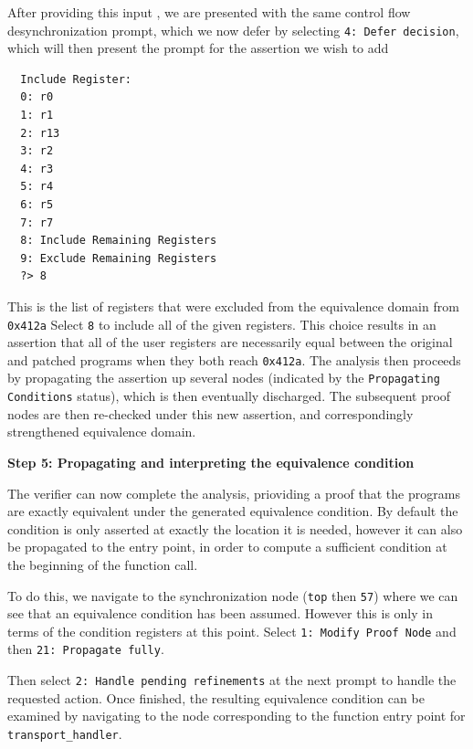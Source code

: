After providing this input , we are presented with the same control flow desynchronization prompt, which we
now defer by selecting \texttt{4: Defer decision}, which will then present the prompt for the assertion we wish to add
\begin{verbatim}
  Include Register:
  0: r0
  1: r1
  2: r13
  3: r2
  4: r3
  5: r4
  6: r5
  7: r7
  8: Include Remaining Registers
  9: Exclude Remaining Registers
  ?> 8
\end{verbatim}

This is the list of registers that were excluded from the equivalence domain from \texttt{0x412a}
Select \texttt{8} to include all of the given registers. This choice results in an assertion that all
of the user registers are necessarily equal between the original and patched programs when they both
reach \texttt{0x412a}.  The analysis then proceeds by propagating the assertion up several nodes
(indicated by the \texttt{Propagating Conditions} status), which is then eventually discharged. The
subsequent proof nodes are then re-checked under this new assertion, and correspondingly strengthened
equivalence domain.

\noindent\textbf{Step 5: Propagating and interpreting the equivalence condition}

The verifier can now complete the analysis, prioviding a proof that the programs are exactly
equivalent under the generated equivalence condition. By default the condition is only asserted at
exactly the location it is needed, however it can also be propagated to the entry point, in order to
compute a sufficient condition at the beginning of the function call.

To do this, we navigate to the synchronization node (\texttt{top} then \texttt{57}) where we can see
that an equivalence condition has been assumed. However this is only in terms of the
condition registers at this point. Select \texttt{1: Modify Proof Node} and then \texttt{21:   Propagate fully}.

Then select \texttt{2: Handle pending refinements} at the next prompt to handle the requested action.
Once finished, the resulting equivalence condition can be examined by navigating to the node
corresponding to the function entry point for \texttt{transport\_handler}.

